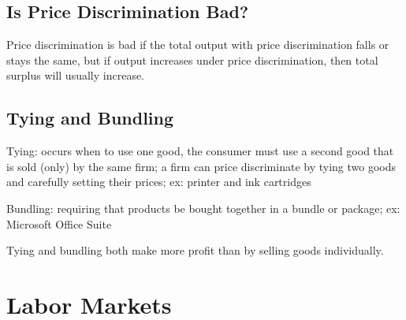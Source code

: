 \documentclass[12pt]{article}
\begin{document}
\subsection{Is Price Discrimination Bad?} 
Price discrimination is bad if the total output with price discrimination falls or stays the same, but if output increases under price discrimination, then total surplus will usually increase. 

\subsection{Tying and Bundling}
\begin{definition} Tying: occurs when to use one good, the consumer must use a second good that is sold (only) by the same firm; a firm can price discriminate by tying two goods and carefully setting their prices; ex: printer and ink cartridges \end{definition}
\begin{definition} Bundling: requiring that products be bought together in a bundle or package; ex: Microsoft Office Suite \end{definition}
Tying and bundling both make more profit than by selling goods individually. 


\section{Labor Markets}
\end{document}
